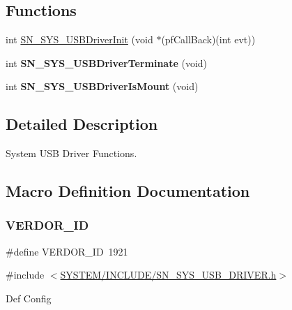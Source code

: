 \subsection*{Functions}
\begin{DoxyCompactItemize}
\item 
int \hyperlink{group__SYSTEM__USB__DRIVER_ga17e02bd678d50a38f21d757443ec938c}{S\+N\+\_\+\+S\+Y\+S\+\_\+\+U\+S\+B\+Driver\+Init} (void $\ast$(pf\+Call\+Back)(int evt))
\item 
\mbox{\label{group__SYSTEM__USB__DRIVER_ga263fc8da4afaeab8f7bb40ed131f1264}} 
int {\bfseries S\+N\+\_\+\+S\+Y\+S\+\_\+\+U\+S\+B\+Driver\+Terminate} (void)
\item 
\mbox{\label{group__SYSTEM__USB__DRIVER_ga20db703e1eb94fe62db97be11c59222d}} 
int {\bfseries S\+N\+\_\+\+S\+Y\+S\+\_\+\+U\+S\+B\+Driver\+Is\+Mount} (void)
\end{DoxyCompactItemize}


\subsection{Detailed Description}
System U\+SB Driver Functions. 



\subsection{Macro Definition Documentation}
\mbox{\label{group__SYSTEM__USB__DRIVER_gaf6b170f580198c8e623aca38a5e96450}} 
\subsubsection{\texorpdfstring{V\+E\+R\+D\+O\+R\+\_\+\+ID}{VERDOR\_ID}}
{\footnotesize\ttfamily \#define V\+E\+R\+D\+O\+R\+\_\+\+ID~1921}



{\ttfamily \#include $<$\hyperlink{SN__SYS__USB__DRIVER_8h}{S\+Y\+S\+T\+E\+M/\+I\+N\+C\+L\+U\+D\+E/\+S\+N\+\_\+\+S\+Y\+S\+\_\+\+U\+S\+B\+\_\+\+D\+R\+I\+V\+E\+R.\+h}$>$}

Def Config 

